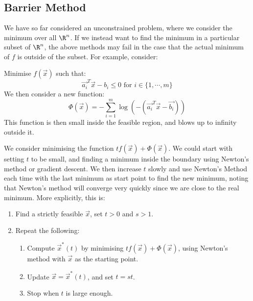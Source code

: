 \documentclass[../Main.tex]{subfiles}
\begin{document}
\subsection{Barrier Method}
We have so far considered an unconstrained problem, where we consider the minimum over all $\R^n$. If we instead want to find the minimum in a particular subset of $\R^n$, the above methods may fail in the case that the actual minimum of $f$ is outside of the subset. For example, consider:

Minimise $f(\vec{x})$ such that:
\begin{equation*}
    \vec{a_i}^T \vec{x} - b_i \leq 0 \text{ for } i \in \{1, \cdots, m\}
\end{equation*}
We then consider a new function:
\begin{equation*}
    \Phi(\vec{x}) = -\sum_{i=1}^m \log\left(-\left(\vec{a_i}^T \vec{x} - \vec{b_i}\right)\right)
\end{equation*}
This function is then small inside the feasible region, and blows up to infinity outside it.

We consider minimising the function $tf(\vec{x}) + \Phi(\vec{x})$. We could start with setting $t$ to be small, and finding a minimum inside the boundary using Newton's method or gradient descent. We then increase $t$ slowly and use Newton's Method each time with the last minimum as start point to find the new minimum, noting that Newton's method will converge very quickly since we are close to the real minimum. More explicitly, this is:
\begin{enumerate}
    \item Find a strictly feasible $\vec{x}$, set $t > 0$ and $s > 1$.
    \item Repeat the following:
    \begin{enumerate}
        \item Compute $\vec{x}^*(t)$ by minimising $tf(\vec{x}) + \Phi(\vec{x})$, using Newton's method with $\vec{x}$ as the starting point.
        \item Update $\vec{x} = \vec{x}^*(t)$, and set $t = st$.
        \item Stop when $t$ is large enough.
    \end{enumerate}
\end{enumerate}
\end{document}
